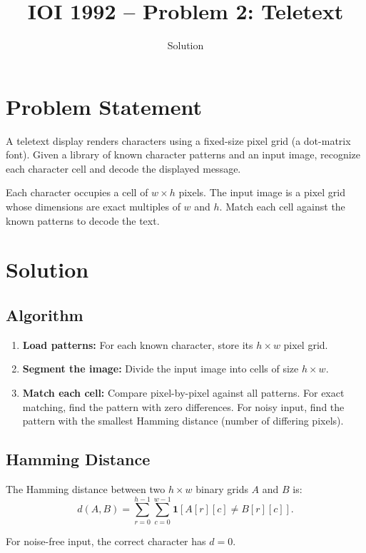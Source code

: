 \documentclass[11pt,a4paper]{article}
\title{IOI 1992 -- Problem 2: Teletext}
\author{Solution}
\date{}
\begin{document}
\maketitle

\section{Problem Statement}

A teletext display renders characters using a fixed-size pixel grid (a
dot-matrix font). Given a library of known character patterns and an input
image, recognize each character cell and decode the displayed message.

Each character occupies a cell of $w \times h$ pixels. The input image is a
pixel grid whose dimensions are exact multiples of $w$ and $h$. Match each
cell against the known patterns to decode the text.

\section{Solution}

\subsection{Algorithm}

\begin{enumerate}
  \item \textbf{Load patterns:} For each known character, store its
    $h \times w$ pixel grid.
  \item \textbf{Segment the image:} Divide the input image into cells of
    size $h \times w$.
  \item \textbf{Match each cell:} Compare pixel-by-pixel against all
    patterns. For exact matching, find the pattern with zero differences.
    For noisy input, find the pattern with the smallest Hamming distance
    (number of differing pixels).
\end{enumerate}

\subsection{Hamming Distance}

The Hamming distance between two $h \times w$ binary grids $A$ and $B$ is:
\[
  d(A, B) = \sum_{r=0}^{h-1} \sum_{c=0}^{w-1}
  \mathbf{1}[A[r][c] \ne B[r][c]].
\]

For noise-free input, the correct character has $d = 0$.
\end{document}
